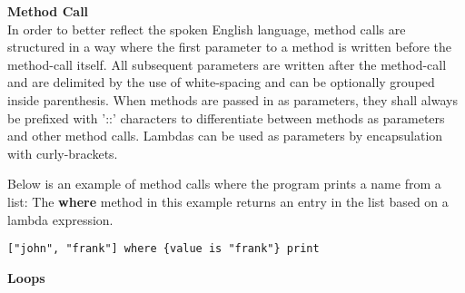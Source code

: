 \textbf{Method Call}\\
In order to better reflect the spoken English language, method calls are structured in a way where the first parameter to a method is written before the method-call itself.
All subsequent parameters are written after the method-call and are delimited by the use of white-spacing and can be optionally grouped inside parenthesis.
When methods are passed in as parameters, they shall always be prefixed with '::' characters to differentiate between methods as parameters and other method calls. 
Lambdas can be used as parameters by encapsulation with curly-brackets. 

Below is an example of method calls where the program prints a name from a list:
The \textbf{where} method in this example returns an entry in the list based on a lambda expression.
\begin{lstlisting}
["john", "frank"] where {value is "frank"} print
\end{lstlisting}

\textbf{Loops}\\
